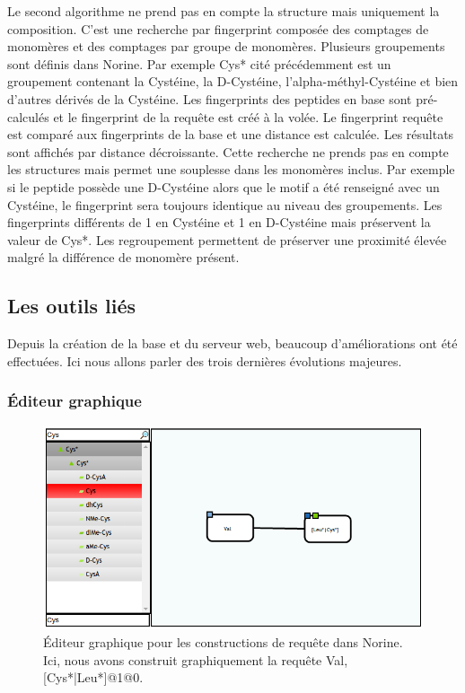 Le second algorithme ne prend pas en compte la structure mais uniquement la composition.
C'est une recherche par fingerprint composée des comptages de monomères et des comptages par groupe de monomères.
Plusieurs groupements sont définis dans Norine.
Par exemple Cys* cité précédemment est un groupement contenant la Cystéine, la D-Cystéine, l'alpha-méthyl-Cystéine et bien d'autres dérivés de la Cystéine.
Les fingerprints des peptides en base sont pré-calculés et le fingerprint de la requête est créé à la volée.
Le fingerprint requête est comparé aux fingerprints de la base et une distance est calculée.
Les résultats sont affichés par distance décroissante.
Cette recherche ne prends pas en compte les structures mais permet une souplesse dans les monomères inclus.
Par exemple si le peptide possède une D-Cystéine alors que le motif a été renseigné avec un Cystéine, le fingerprint sera toujours identique au niveau des groupements.
Les fingerprints différents de 1 en Cystéine et 1 en D-Cystéine mais préservent la valeur de Cys*.
Les regroupement permettent de préserver une proximité élevée malgré la différence de monomère présent.



\subsection{Les outils liés}

Depuis la création de la base et du serveur web, beaucoup d'améliorations ont été effectuées.
Ici nous allons parler des trois dernières évolutions majeures.


\subsubsection{Éditeur graphique}

\begin{figure}[h!]
  \begin{center}
    \includegraphics[width=450px]{Figures/Norine/editor.png}
    \caption{\label{editor}Éditeur graphique pour les constructions de requête dans Norine.
    Ici, nous avons construit graphiquement la requête Val,[Cys*|Leu*]@1@0.}
  \end{center}
\end{figure}

